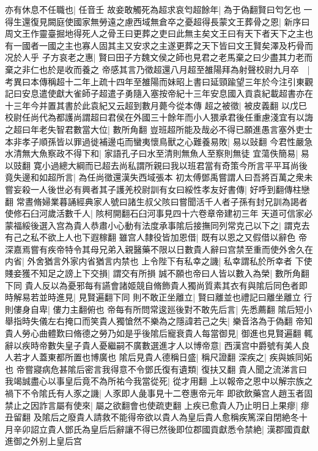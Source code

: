 亦有休息不任職也|{
	任音壬}
故妾敢觸死為超求哀匄超餘年|{
	為于偽翻賢曰匄乞也}
一得生還復見闕庭使國家無勞遠之慮西域無倉卒之憂超得長蒙文王葬骨之恩|{
	新序曰周文王作靈臺掘地得死人之骨王曰更葬之吏曰此無主矣文王曰有天下者天下之主也有一國者一國之主也寡人固其主又安求之主遂更葬之天下皆曰文王賢矣澤及朽骨而况於人乎}
子方哀老之惠|{
	賢曰田子方魏文侯之師也見君之老馬棄之曰少盡其力老而棄之非仁也於是收而養之}
帝感其言乃徵超還八月超至雒陽拜為射聲校尉九月卒　|{
	考異曰本傳稱超十二年上疏十四年至雒陽而妹昭上書曰延頸踰望三年於今注引東觀記曰安息遣使獻大雀師子超遣子勇隨入塞按帝紀十三年安息國入貢袁紀載超書亦在十三年今并置其書於此袁紀又云超到數月薨今從本傳}
超之被徵|{
	被皮義翻}
以戊巳校尉任尚代為都護尚謂超曰君侯在外國三十餘年而小人猥承君後任重慮淺宜有以誨之超曰年老失智君數當大位|{
	數所角翻}
豈班超所能及哉必不得已願進愚言塞外吏士本非孝子順孫皆以罪過徙補邊屯而蠻夷懷鳥獸之心難養易敗|{
	易以䜴翻}
今君性嚴急水清無大魚察政不得下和|{
	家語孔子曰水至清則無魚人至察則無徒}
宜蕩佚簡易|{
	易以豉翻}
寛小過總大綱而已超去尚私謂所親曰我以班君當有奇策今所言平平耳尚後竟失邊和如超所言|{
	為任尚徵還漢失西域張本}
初太傅鄧禹嘗謂人曰吾將百萬之衆未嘗妄殺一人後世必有興者其子護羌校尉訓有女曰綏性孝友好書傳|{
	好呼到翻傳柱戀翻}
常晝脩婦業暮誦經典家人號曰諸生叔父陔曰嘗聞活千人者子孫有封兄訓為謁者使修石臼河歲活數千人|{
	陔柯開翻石臼河事見四十六卷章帝建初三年}
天道可信家必蒙福綏後選入宫為貴人恭肅小心動有法度承事隂后接撫同列常克己以下之|{
	謂克去有己之私不欲上人也下遐稼翻}
雖宫人隸役皆加恩借|{
	既有以恩之又假借以辭色}
帝深嘉焉嘗有疾帝特令其母兄弟入親醫藥不限以日數貴人辭曰宫禁至重而使外舍久在内省|{
	外舍猶言外家内省猶言内禁也}
上令陛下有私幸之譏|{
	私幸謂私於所幸者}
下使賤妾獲不知足之謗上下交損|{
	謂交有所損}
誠不願也帝曰人皆以數入為榮|{
	數所角翻下同}
貴人反以為憂邪每有讌會諸姬競自脩飾貴人獨尚質素其衣有與隂后同色者即時解易若並時進見|{
	見賢遍翻下同}
則不敢正坐離立|{
	賢曰離並也禮記曰離坐離立}
行則僂身自卑|{
	僂力主翻俯也}
帝每有所問常逡廵後對不敢先后言|{
	先悉薦翻}
隂后短小舉指時失儀左右掩口而笑貴人獨愴然不樂為之隱諱若己之失|{
	樂音洛為于偽翻}
帝知貴人勞心曲體歎曰脩德之勞乃如是乎後隂后寵衰貴人每當御見|{
	御進也見賢遍翻}
輒辭以疾時帝數失皇子貴人憂繼嗣不廣數選進才人以博帝意|{
	西漢宫中爵號有美人良人若才人蓋東都所置也博廣也}
隂后見貴人德稱日盛|{
	稱尺證翻}
深疾之|{
	疾與嫉同妬也}
帝嘗寢病危甚隂后密言我得意不令鄧氏復有遺類|{
	復扶又翻}
貴人聞之流涕言曰我竭誠盡心以事皇后竟不為所祐今我當從死|{
	從才用翻}
上以報帝之恩中以解宗族之禍下不令隂氏有人豕之譏|{
	人豕即人彘事見十二卷惠帝元年}
即欲飲藥宫人趙玉者固禁止之因詐言屬有使來|{
	屬之欲翻會也使疏吏翻}
上疾已愈貴人乃止明日上果瘳|{
	瘳丑留翻}
及隂后之廢貴人請救不能得帝欲以貴人為皇后貴人愈稱疾篤深自閉絶冬十月辛卯詔立貴人鄧氏為皇后后辭讓不得已然後即位郡國貢獻悉令禁絶|{
	漢郡國貢獻進御之外别上皇后宫}
